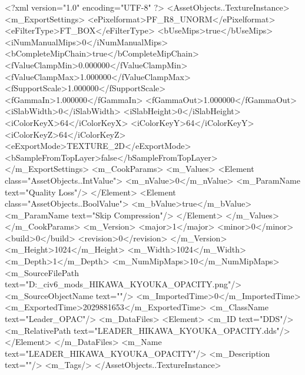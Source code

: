 <?xml version="1.0" encoding="UTF-8" ?>
<AssetObjects..TextureInstance>
	<m_ExportSettings>
		<ePixelformat>PF_R8_UNORM</ePixelformat>
		<eFilterType>FT_BOX</eFilterType>
		<bUseMips>true</bUseMips>
		<iNumManualMips>0</iNumManualMips>
		<bCompleteMipChain>true</bCompleteMipChain>
		<fValueClampMin>0.000000</fValueClampMin>
		<fValueClampMax>1.000000</fValueClampMax>
		<fSupportScale>1.000000</fSupportScale>
		<fGammaIn>1.000000</fGammaIn>
		<fGammaOut>1.000000</fGammaOut>
		<iSlabWidth>0</iSlabWidth>
		<iSlabHeight>0</iSlabHeight>
		<iColorKeyX>64</iColorKeyX>
		<iColorKeyY>64</iColorKeyY>
		<iColorKeyZ>64</iColorKeyZ>
		<eExportMode>TEXTURE_2D</eExportMode>
		<bSampleFromTopLayer>false</bSampleFromTopLayer>
	</m_ExportSettings>
	<m_CookParams>
		<m_Values>
			<Element class="AssetObjects..IntValue">
				<m_nValue>0</m_nValue>
				<m_ParamName text="Quality Loss"/>
			</Element>
			<Element class="AssetObjects..BoolValue">
				<m_bValue>true</m_bValue>
				<m_ParamName text="Skip Compression"/>
			</Element>
		</m_Values>
	</m_CookParams>
	<m_Version>
		<major>1</major>
		<minor>0</minor>
		<build>0</build>
		<revision>0</revision>
	</m_Version>
	<m_Height>1024</m_Height>
	<m_Width>1024</m_Width>
	<m_Depth>1</m_Depth>
	<m_NumMipMaps>10</m_NumMipMaps>
	<m_SourceFilePath text="D:\Documents\GitHub\Uzuki_civ6_mods\LandsolKyouka\LEADER_HIKAWA_KYOUKA_OPACITY.png"/>
	<m_SourceObjectName text=""/>
	<m_ImportedTime>0</m_ImportedTime>
	<m_ExportedTime>2029881653</m_ExportedTime>
	<m_ClassName text="Leader_OPAC"/>
	<m_DataFiles>
		<Element>
			<m_ID text="DDS"/>
			<m_RelativePath text="LEADER_HIKAWA_KYOUKA_OPACITY.dds"/>
		</Element>
	</m_DataFiles>
	<m_Name text="LEADER_HIKAWA_KYOUKA_OPACITY"/>
	<m_Description text=""/>
	<m_Tags/>
</AssetObjects..TextureInstance>

